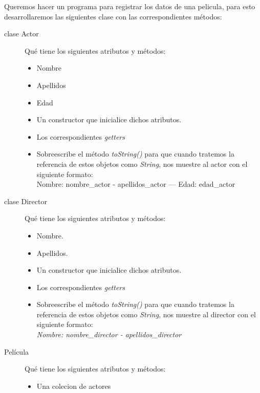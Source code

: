 \documentclass[addpoints,12pt]{exam}
\begin{document}
\begin{center}
\end{center}
\vspace{0.1in}
\begin{questions}
\question Queremos hacer un programa para registrar los datos de una pelicula, para esto desarrollaremos las siguientes clase con las correspondientes métodos:
\begin{description}
\item[clase Actor] Qué tiene los siguientes atributos y métodos:
\begin{itemize}
\item Nombre
\item Apellidos
\item Edad
\item Un constructor que inicialice dichos atributos.
\item Los correspondientes \emph{getters}
\item Sobreescribe el método \emph{toString()} para que cuando tratemos la referencia de estos objetos como \emph{String}, nos muestre al actor con el siguiente formato:\\
Nombre: nombre\_actor - apellidos\_actor --- Edad: edad\_actor
\end{itemize}
\item[clase Director] Qué tiene los siguientes atributos y métodos:
\begin{itemize}
\item Nombre.
\item Apellidos.
\item Un constructor que inicialice dichos atributos.
\item Los correspondientes \emph{getters}
\item Sobreescribe el método \emph{toString()} para que cuando tratemos la referencia de estos objetos como \emph{String}, nos muestre al director con el siguiente formato:\\
\emph{Nombre: nombre\_director - apellidos\_director}
\end{itemize}
\item[Película] Qué tiene los siguientes atributos y métodos:
\begin{itemize}
\item Una colecion de actores

\end{itemize}
\end{description}
\end{questions}
\end{document}
